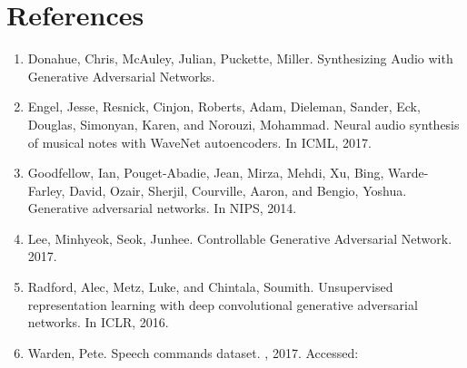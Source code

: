 \documentclass{article}
\begin{document}
\section{References}

\begin{enumerate}

\item
  Donahue, Chris, McAuley, Julian, Puckette, Miller. Synthesizing Audio with Generative Adversarial Networks.
\item
  Engel, Jesse, Resnick, Cinjon, Roberts, Adam, Dieleman, Sander, Eck, Douglas, Simonyan, Karen, and Norouzi, Mohammad. Neural audio synthesis of musical notes with WaveNet autoencoders. In ICML, 2017.
\item
  Goodfellow, Ian, Pouget-Abadie, Jean, Mirza, Mehdi, Xu, Bing, Warde-Farley, David, Ozair, Sherjil, Courville, Aaron, and Bengio, Yoshua. Generative adversarial networks. In NIPS, 2014.
\item
  Lee, Minhyeok, Seok, Junhee. Controllable Generative Adversarial Network. 2017.
\item
  Radford, Alec, Metz, Luke, and Chintala, Soumith. Unsupervised representation learning with deep convolutional generative adversarial networks. In ICLR, 2016.
\item
  Warden, Pete. Speech commands dataset.
, 2017.
Accessed:

\end{enumerate}

\end{document}
